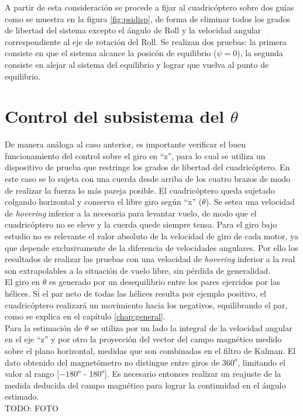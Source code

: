 \documentclass[main]{subfiles}
\begin{document}
A partir de esta consideraci\'on se procede a fijar al cuadric\'optero sobre dos gu\'ias como se muestra en la figura \ref{fig:psidisp}, de forma de eliminar todos los grados de libertad del sistema excepto el \'angulo de Roll y la velocidad angular correspondiente al eje de rotaci\'on del Roll. Se realizan dos pruebas: la primera consiste en que el sistema alcance la posic\'on de equilibrio ($\psi = 0$), la segunda consiste en alejar al sistema del equilibrio y lograr que vuelva al punto de equilibrio.

\section{Control del subsistema del $\theta$}

De manera análoga al caso anterior, es importante verificar el buen funcionamiento del control sobre el giro en ``z'', para lo cual se utiliza un dispositivo de prueba que restringe los grados de libertad del cuadricóptero. En este caso se lo sujeta con una cuerda desde arriba de los cuatro brazos de modo de realizar la fuerza lo más pareja posible. El cuadricóptero queda sujetado colgando horizontal y conserva el libre giro según ``x'' ($\theta$).
Se setea una velocidad de \emph{hovering} inferior a la necesaria para levantar vuelo, de modo que el cuadricóptero no se eleve y la cuerda quede siempre tensa. Para el giro bajo estudio no es relevante el valor absoluto de la velocidad de giro de cada motor, ya que depende exclusivamente de la diferencia de velocidades angulares. Por ello los resultados de realizar las pruebas con una velocidad de \emph{hovering} inferior a la real son extrapolables a la situación de vuelo libre, sin pérdida de generalidad.\\

El giro en $\theta$ es generado por un desequilibrio entre los pares ejercidos por las hélices. Si el par neto de todas las hélices resulta por ejemplo positivo, el cuadricóptero realizará un movimiento hacia los negativos, equilibrando el par, como se explica en el capítulo \ref{chap:general}.\\

Para la estimación de $\theta$ se utiliza por un lado la integral de la velocidad angular en el eje ``z'' y por otro la proyección del vector del campo magnético medido sobre el plano horizontal, medidas que son combinadas en el filtro de Kalman. El dato obtenido del magnetómetro no distingue entre giros de $360^o$, limitando el valor al rango [$-180^o$ - $180^o$]. Es necesario entonces realizar un reajuste de la medida deducida del campo magnético para lograr la continuidad en el ángulo estimado.\\

TODO: FOTO
\end{document}
